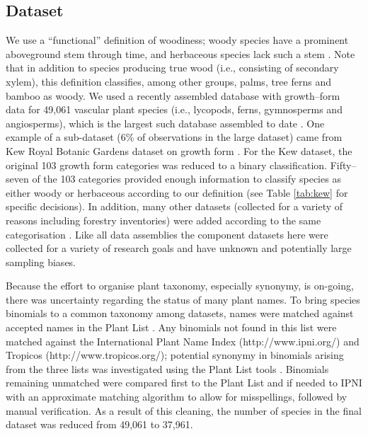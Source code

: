 \documentclass[a4paper,12pt]{article}
\begin{document}
\subsection{Dataset}

We use a ``functional'' definition of woodiness; woody species have a
prominent aboveground stem through time, and herbaceous species lack
such a stem \citep[see an early use of this definition
by][]{gray1887elements}.  Note that in addition to species producing
true wood (i.e., consisting of secondary xylem), this definition
classifies, among other groups, palms, tree ferns and bamboo as
woody.
%
We used a recently assembled database with growth--form data for
49,061 vascular plant species (i.e., lycopods, ferns, gymnosperms and
angiosperms), which is the largest such database assembled to date
\citep{Zanne}.
One example of a sub-dataset (6\% of observations in the large
dataset) came from Kew Royal Botanic Gardens dataset on growth form
\citep{Kew}.  For the Kew dataset, the original 103 growth form
categories was reduced to a binary classification.  Fifty--seven of
the 103 categories provided enough information to classify species as
either woody or herbaceous according to our definition (see Table
\ref{tab:kew} for specific decisions).  In addition, many other
datasets (collected for a variety of reasons including forestry
inventories) were added according to the same categorisation
\citep{Zanne}.  Like all data assemblies the component datasets here
were collected for a variety of research goals and have unknown and
potentially large sampling biases.

Because the effort to organise plant taxonomy, especially synonymy, is
on-going, there was uncertainty regarding the status of many plant
names.
%
To bring species binomials to a common taxonomy among datasets, names
were matched against accepted names in the Plant List
\citep{ThePlantList}.  Any binomials not found in this list were
matched against the International Plant Name Index
(http://www.ipni.org/) and Tropicos (http://www.tropicos.org/);
potential synonymy in binomials arising from the three lists was
investigated using the Plant List tools \citep{ThePlantList}.  
Binomials remaining unmatched were compared first to the Plant List
and if needed to IPNI with an approximate matching algorithm to allow
for misspellings, followed by manual verification. As a result of this 
cleaning, the number of species in the final dataset  was reduced 
from 49,061 to 37,961. 
\end{document}
